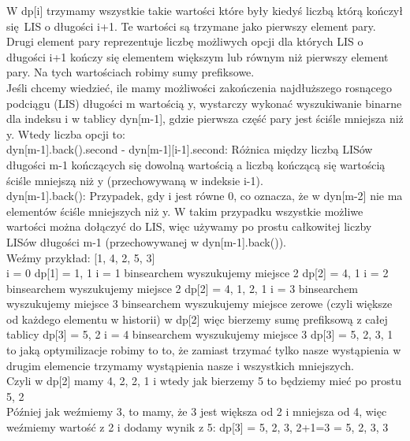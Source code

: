 \documentclass[12pt]{article}
\begin{document}
W dp[i] trzymamy wszystkie takie wartości które były kiedyś liczbą którą kończył się LIS o długości i+1. Te wartości są trzymane jako pierwszy element pary. Drugi element pary reprezentuje liczbę możliwych opcji dla których LIS o długości i+1 kończy się elementem większym lub równym niż pierwszy element pary. Na tych wartościach robimy sumy prefiksowe.\\

Jeśli chcemy wiedzieć, ile mamy możliwości zakończenia najdłuższego rosnącego podciągu (LIS) długości m wartością y, wystarczy wykonać wyszukiwanie binarne dla indeksu i w tablicy dyn[m-1], gdzie pierwsza część pary jest ściśle mniejsza niż y. Wtedy liczba opcji to:\\

dyn[m-1].back().second - dyn[m-1][i-1].second: Różnica między liczbą LISów długości m-1 kończących się dowolną wartością a liczbą kończącą się wartością ściśle mniejszą niż y (przechowywaną w indeksie i-1).\\

dyn[m-1].back(): Przypadek, gdy i jest równe 0, co oznacza, że w dyn[m-2] nie ma elementów ściśle mniejszych niż y. W takim przypadku wszystkie możliwe wartości można dołączyć do LIS, więc używamy po prostu całkowitej liczby LISów długości m-1 (przechowywanej w dyn[m-1].back()).\\


Weźmy przykład:
[1, 4, 2, 5, 3]\\

i = 0
dp[1] = {{1, 1}}
i = 1
binsearchem wyszukujemy miejsce 2 
dp[2] = {{4, 1}}
i = 2
binsearchem wyszukujemy miejsce 2
dp[2] = {{4, 1}, {2, 1}}
i = 3 
binsearchem wyszukujemy miejsce 3 
binsearchem wyszukujemy miejsce zerowe (czyli większe od każdego elementu w historii) w dp[2]
więc bierzemy sumę prefiksową z całej tablicy 
dp[3] = {{5, 2}}
i = 4
binsearchem wyszukujemy miejsce 3
dp[3] = {{5, 2}, {3, 1}}\\

to jaką optymilizacje robimy to to, że zamiast trzymać tylko nasze wystąpienia w drugim elemencie trzymamy wystąpienia nasze i wszystkich mniejszych. \\

Czyli w dp[2] mamy {{4, 2}, {2, 1}} i wtedy jak bierzemy 5 to będziemy mieć po prostu {5, 2}\\

Później jak weźmiemy 3, to mamy, że 3 jest większa od 2 i mniejsza od 4, więc weźmiemy wartość z 2 i dodamy wynik z 5:
dp[3] = {{5, 2}, {3, 2+1=3}} = {{5, 2}, {3, 3}}\\
\end{document}
